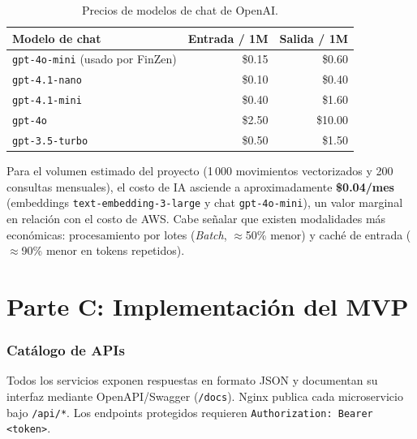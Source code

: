 \documentclass[12pt,letterpaper]{article}
\begin{document}
\begin{table}[H]
\centering
\small
\begin{tabular}{l r r}
\toprule
\textbf{Modelo de chat} & \textbf{Entrada / 1M} & \textbf{Salida / 1M} \\
\midrule
\texttt{gpt-4o-mini} (usado por FinZen) & \$0.15 & \$0.60 \\
\texttt{gpt-4.1-nano} & \$0.10 & \$0.40 \\
\texttt{gpt-4.1-mini} & \$0.40 & \$1.60 \\
\texttt{gpt-4o} & \$2.50 & \$10.00 \\
\texttt{gpt-3.5-turbo} & \$0.50 & \$1.50 \\
\bottomrule
\end{tabular}
\caption{Precios de modelos de chat de OpenAI.}
\end{table}

Para el volumen estimado del proyecto (1\,000 movimientos vectorizados y 200 consultas
mensuales), el costo de IA asciende a aproximadamente \textbf{\$0.04/mes} (embeddings
\texttt{text-embedding-3-large} y chat \texttt{gpt-4o-mini}), un valor marginal en
relaci\'on con el costo de AWS. Cabe se\~nalar que existen modalidades m\'as
econ\'omicas: procesamiento por lotes (\emph{Batch}, $\approx$50\% menor) y cach\'e de
entrada ($\approx$90\% menor en tokens repetidos).

\clearpage
\part*{Parte C: Implementaci\'on del MVP}

\section{Cat\'alogo de APIs}
Todos los servicios exponen respuestas en formato JSON y documentan su interfaz mediante OpenAPI/Swagger (\texttt{/docs}).
Nginx publica cada microservicio bajo \texttt{/api/*}. Los endpoints protegidos
requieren \texttt{Authorization: Bearer <token>}.
\end{document}

